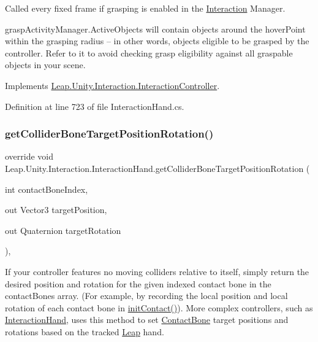 Called every fixed frame if grasping is enabled in the \mbox{\hyperlink{namespace_leap_1_1_unity_1_1_interaction}{Interaction}} Manager. 

grasp\+Activity\+Manager.\+Active\+Objects will contain objects around the hover\+Point within the grasping radius -- in other words, objects eligible to be grasped by the controller. Refer to it to avoid checking grasp eligibility against all graspable objects in your scene. 

Implements \mbox{\hyperlink{class_leap_1_1_unity_1_1_interaction_1_1_interaction_controller_a5d182056bac8aea2d0ec005e35f768ca}{Leap.\+Unity.\+Interaction.\+Interaction\+Controller}}.



Definition at line 723 of file Interaction\+Hand.\+cs.

\mbox{\label{class_leap_1_1_unity_1_1_interaction_1_1_interaction_hand_a760d127098bcd961aa2ede7c279faa9c}} 
\subsubsection{\texorpdfstring{getColliderBoneTargetPositionRotation()}{getColliderBoneTargetPositionRotation()}}
{\footnotesize\ttfamily override void Leap.\+Unity.\+Interaction.\+Interaction\+Hand.\+get\+Collider\+Bone\+Target\+Position\+Rotation (\begin{DoxyParamCaption}\item[{int}]{contact\+Bone\+Index,  }\item[{out Vector3}]{target\+Position,  }\item[{out Quaternion}]{target\+Rotation }\end{DoxyParamCaption})\hspace{0.3cm}{\ttfamily [protected]}, {\ttfamily [virtual]}}



If your controller features no moving colliders relative to itself, simply return the desired position and rotation for the given indexed contact bone in the contact\+Bones array. (For example, by recording the local position and local rotation of each contact bone in \mbox{\hyperlink{class_leap_1_1_unity_1_1_interaction_1_1_interaction_hand_a01581c96fd67f53a9b8a6ddc36e0709c}{init\+Contact()}}). More complex controllers, such as \mbox{\hyperlink{class_leap_1_1_unity_1_1_interaction_1_1_interaction_hand}{Interaction\+Hand}}, uses this method to set \mbox{\hyperlink{class_leap_1_1_unity_1_1_interaction_1_1_contact_bone}{Contact\+Bone}} target positions and rotations based on the tracked \mbox{\hyperlink{namespace_leap_1_1_unity_1_1_leap}{Leap}} hand. 



